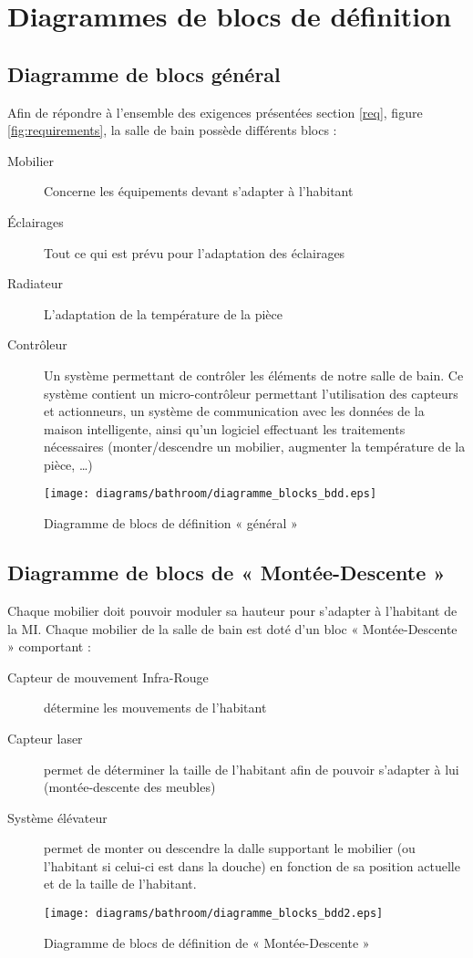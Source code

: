 \chapter{Diagrammes de blocs de définition}
\section{Diagramme de blocs général}
Afin de répondre à l'ensemble des exigences présentées section \ref{req}, figure \ref{fig:requirements}, la salle de bain possède différents blocs : 
\begin{description}
	\item[Mobilier] Concerne les équipements devant s'adapter à l'habitant
	\item[Éclairages] Tout ce qui est prévu pour l'adaptation des éclairages
	\item[Radiateur] L'adaptation de la température de la pièce
	\item[Contrôleur] Un système permettant de contrôler les éléments de notre salle de bain. Ce système contient un micro-contrôleur permettant l'utilisation des capteurs et actionneurs, un système de communication avec les données de la maison intelligente, ainsi qu'un logiciel effectuant les traitements nécessaires (monter/descendre un mobilier, augmenter la température de la pièce, \ldots)
\end{description}
\vfill

\begin{figure}[H]
	\centering
	\texttt{[image: diagrams/bathroom/diagramme\_blocks\_bdd.eps]}
	\caption{Diagramme de blocs de définition « général »}
	\label{fig:diagramme_bdd}
\end{figure}
\vfill
\pagebreak
\section{Diagramme de blocs de « Montée-Descente »}
Chaque mobilier doit pouvoir moduler sa hauteur pour s'adapter à l'habitant de la MI. Chaque mobilier de la salle de bain est doté d'un bloc « Montée-Descente » comportant :
\begin{description}
	\item[Capteur de mouvement Infra-Rouge] détermine les mouvements de l'habitant
	\item[Capteur laser] permet de déterminer la taille de l'habitant afin de pouvoir s'adapter à lui (montée-descente des meubles)
	\item[Système élévateur] permet de monter ou descendre la dalle supportant le mobilier (ou l'habitant si celui-ci est dans la douche) en fonction de sa position actuelle et de la taille de l'habitant.   
\end{description}
\vfill
\begin{figure}[H]
	\centering
	\texttt{[image: diagrams/bathroom/diagramme\_blocks\_bdd2.eps]}
	\caption{Diagramme de blocs de définition de « Montée-Descente »}
	\label{fig:diagramme_bdd2}
\end{figure}
\vfill
